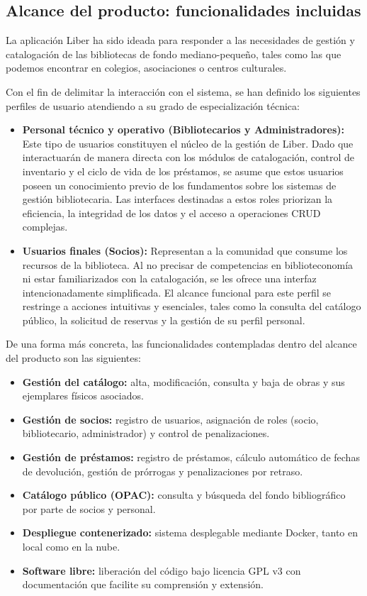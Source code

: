 \subsection{Alcance del producto: funcionalidades incluidas}
La aplicación Liber ha sido ideada para responder a las 
necesidades de gestión y catalogación de las bibliotecas de fondo 
mediano-pequeño, tales como las que podemos encontrar en colegios, 
asociaciones o centros culturales.

Con el fin de delimitar la interacción con el sistema, se han definido los 
siguientes perfiles de usuario atendiendo a su grado de especialización técnica:

\begin{itemize}
	\item \textbf{Personal técnico y operativo (Bibliotecarios y Administradores):}
	Este tipo de usuarios constituyen el núcleo de la gestión de Liber. Dado que interactuarán de manera directa con los módulos de catalogación, control de inventario y el ciclo de vida de los préstamos, se asume que estos usuarios poseen un conocimiento previo de los fundamentos sobre los sistemas de gestión bibliotecaria. Las interfaces destinadas a estos roles priorizan la eficiencia, la integridad de los datos y el acceso a operaciones CRUD complejas.
	
	\item \textbf{Usuarios finales (Socios):} 
	Representan a la comunidad que consume los recursos de la biblioteca. Al no precisar de competencias en biblioteconomía ni estar familiarizados con la catalogación, se les ofrece una interfaz intencionadamente simplificada. El alcance funcional para este perfil se restringe a acciones intuitivas y esenciales, tales como la consulta del catálogo público, la solicitud de reservas y la gestión de su perfil personal.
\end{itemize}

De una forma más concreta, las funcionalidades contempladas dentro del alcance 
del producto son las siguientes:

\begin{itemize}
	\item \textbf{Gestión del catálogo:} alta, modificación, consulta y baja de 
	obras y sus ejemplares físicos asociados.
	\item \textbf{Gestión de socios:} registro de usuarios, asignación de roles 
	(socio, bibliotecario, administrador) y control de penalizaciones.
	\item \textbf{Gestión de préstamos:} registro de préstamos, cálculo automático 
	de fechas de devolución, gestión de prórrogas y penalizaciones por retraso.
	\item \textbf{Catálogo público (OPAC):} consulta y búsqueda del fondo 
	bibliográfico por parte de socios y personal.
	\item \textbf{Despliegue contenerizado:} sistema desplegable mediante Docker, 
	tanto en local como en la nube.
	\item \textbf{Software libre:} liberación del código bajo licencia GPL v3 con 
	documentación que facilite su comprensión y extensión.
\end{itemize}

